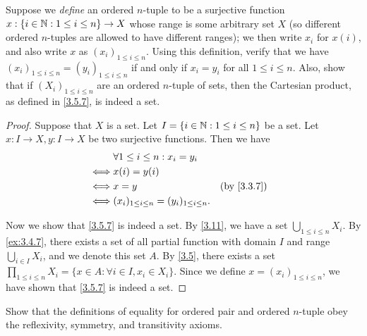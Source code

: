 \begin{ex}\label{ex:3.5.2}
  Suppose we \emph{define} an ordered \(n\)-tuple to be a surjective function \(x : \{i \in \mathbb{N} : 1 \leq i \leq n\} \to X\) whose range is some arbitrary set \(X\) (so different ordered \(n\)-tuples are allowed to have different ranges);
  we then write \(x_i\) for \(x(i)\), and also write \(x\) as \((x_i)_{1 \leq i \leq n}\).
  Using this definition, verify that we have \((x_i)_{1 \leq i \leq n} = (y_i)_{1 \leq i \leq n}\) if and only if \(x_i = y_i\) for all \(1 \leq i \leq n\).
  Also, show that if \((X_i)_{1 \leq i \leq n}\) are an ordered \(n\)-tuple of sets, then the Cartesian product, as defined in \cref{3.5.7}, is indeed a set.
\end{ex}

\begin{proof}
  Suppose that \(X\) is a set.
  Let \(I = \{i \in \mathbb{N} : 1 \leq i \leq n\}\) be a set.
  Let \(x : I \to X, y : I \to X\) be two surjective functions.
  Then we have
  \begin{align*}
         & \forall 1 \leq i \leq n : x_i = y_i                                              \\
    \iff & x(i) = y(i)                                                                      \\
    \iff & x = y                                              &  & \text{(by \cref{3.3.7})} \\
    \iff & (x_i)_{1 \leq i \leq n} = (y_i)_{1 \leq i \leq n}.
  \end{align*}

  Now we show that \cref{3.5.7} is indeed a set.
  By \cref{3.11}, we have a set \(\bigcup_{1 \leq i \leq n} X_i\).
  By \cref{ex:3.4.7}, there exists a set of all partial function with domain \(I\) and range \(\bigcup_{i \in I} X_i\), and we denote this set \(A\).
  By \cref{3.5}, there exists a set \(\prod_{1 \leq i \leq n} X_i = \{x \in A : \forall i \in I, x_i \in X_i\}\).
  Since we define \(x = (x_i)_{1 \leq i \leq n}\), we have shown that \cref{3.5.7} is indeed a set.
\end{proof}

\begin{ex}\label{ex:3.5.3}
  Show that the definitions of equality for ordered pair and ordered \(n\)-tuple obey the reflexivity, symmetry, and transitivity axioms.
\end{ex}

